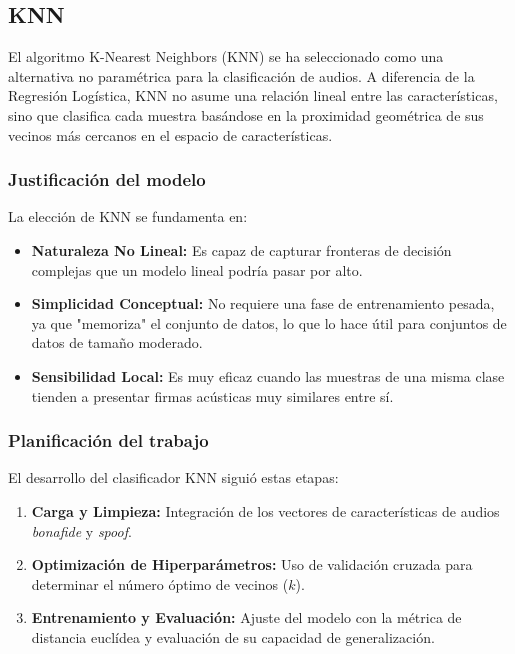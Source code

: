 \subsection{KNN}

El algoritmo K-Nearest Neighbors (KNN) se ha seleccionado como una alternativa no paramétrica para la clasificación de audios. A diferencia de la Regresión Logística, KNN no asume una relación lineal entre las características, sino que clasifica cada muestra basándose en la proximidad geométrica de sus vecinos más cercanos en el espacio de características.

\subsubsection*{Justificación del modelo}

La elección de KNN se fundamenta en:
\begin{itemize}
    \item \textbf{Naturaleza No Lineal:} Es capaz de capturar fronteras de decisión complejas que un modelo lineal podría pasar por alto.
    \item \textbf{Simplicidad Conceptual:} No requiere una fase de entrenamiento pesada, ya que "memoriza" el conjunto de datos, lo que lo hace útil para conjuntos de datos de tamaño moderado.
    \item \textbf{Sensibilidad Local:} Es muy eficaz cuando las muestras de una misma clase tienden a presentar firmas acústicas muy similares entre sí.
\end{itemize}

\subsubsection*{Planificación del trabajo}

El desarrollo del clasificador KNN siguió estas etapas:
\begin{enumerate}
    \item \textbf{Carga y Limpieza:} Integración de los vectores de características de audios \textit{bonafide} y \textit{spoof}.
    \item \textbf{Optimización de Hiperparámetros:} Uso de validación cruzada para determinar el número óptimo de vecinos ($k$).
    \item \textbf{Entrenamiento y Evaluación:} Ajuste del modelo con la métrica de distancia euclídea y evaluación de su capacidad de generalización.
\end{enumerate}

